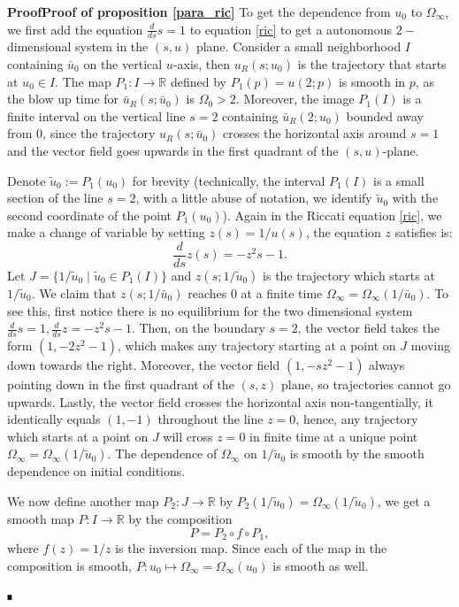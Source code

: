 \documentclass[letterpaper,11pt]{article}
\numberwithin{equation}{section}
\theoremstyle{plain}
\newenvironment{Proof}[1][.]%
 {\begin{trivlist}\item[]\textbf{Proof#1 }}%
 {\hspace*{\fill}$\rule{0.3\baselineskip}{0.35\baselineskip}$\end{trivlist}}
\begin{document}
\begin{Proof}[\textbf{Proof of proposition \ref{para_ric}}] To get the dependence from $u_0$ to $\Omega_\infty$, we first add the equation $\frac{d}{ds}s=1$ to equation \eqref{ric} to get a autonomous $2-$dimensional system in the $(s,u)$ plane. Consider a small neighborhood $I$ containing $\bar{u}_0$ on the vertical $u$-axis, then $u_R(s; u_0)$ is the trajectory that starts at $u_0 \in I$. The map $P_1 : I \to \mathbb{R}$ defined by $P_1(p) = u(2; p)$ is smooth in $p$, as the blow up time for $\bar{u}_R(s;\bar{u}_0)$ is $\Omega_0 >2$. Moreover, the image $P_1(I)$ is a finite interval on the vertical line $s=2$ containing $\bar{u}_R(2;u_0)$ bounded away from $0$, since the trajectory $u_R(s;\bar{u}_0)$ crosses the horizontal axis around $s=1$ and the vector field goes upwards in the first quadrant of the $(s,u)$-plane.

Denote $\tilde{u}_0:= P_1(u_0)$ for brevity (technically, the interval $P_1(I)$ is a small section of the line $s=2$, with a little abuse of notation, we identify $\tilde{u}_0$ with the second coordinate of the point $P_1(u_0)$). Again in the Riccati equation \eqref{ric}, we make a change of variable by setting $z(s) = 1/u(s)$, the equation $z$ satisfies is:
\[
\frac{d}{ds}z(s) = -z^2s -1.
\]
Let $J = \{ 1/\tilde{u}_0 \mid  \tilde{u}_0 \in P_1(I)\}$ and $z(s; 1/\tilde{u}_0)$ is the trajectory which starts at $1/\tilde{u}_0$. We claim that $z(s; 1/\bar{u}_0)$ reaches $0$ at a finite time $\Omega_\infty = \Omega_\infty(1/\bar{u}_0)$. To see this, first notice there is no equilibrium for the two dimensional system $\frac{d}{ds}s=1, \frac{d}{ds}z=-z^2s-1$. Then, on the boundary $s=2$, the vector field takes the form $(1,-2z^2-1)$, which makes any trajectory starting at a point on $J$ moving down towards the right. Moreover, the vector field $(1,-sz^2-1)$ always pointing down in the first quadrant of the $(s,z)$ plane, so trajectories cannot go upwards. Lastly, the vector field crosses the horizontal axis non-tangentially, it identically equals $(1,-1)$ throughout the line $z=0$, hence, any trajectory which starts at a point on $J$ will cross $z=0$ in finite time at a unique point $\Omega_\infty = \Omega_\infty(1/\tilde{u}_0)$. The dependence of $\Omega_\infty$ on $1/\tilde{u}_0$ is smooth by the smooth dependence on initial conditions.

 We now define another map $P_2 : J \to \mathbb{R}$ by $P_2(1/\tilde{u}_0) = \Omega_\infty(1/\tilde{u}_0)$, we get a smooth map $P: I \to \mathbb{R}$ by the composition
 \[
 P =P_2 \circ f \circ P_1,
 \] 
 where $f(z) = 1/z$ is the inversion map. Since each of the map in the composition is smooth, $P: u_0 \mapsto \Omega_\infty = \Omega_\infty(u_0)$ is smooth as well.


\end{Proof}
\end{document}
